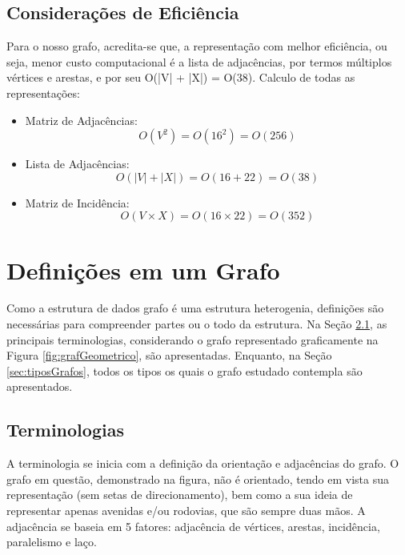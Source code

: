 	\section{Considerações de Eficiência}\label{sec:eficienciaRepresentacao}
	Para o nosso grafo, acredita-se que, a representação com melhor eficiência, ou seja, menor custo computacional é a lista de adjacências, por termos múltiplos vértices e arestas, e por seu O(|V| + |X|) = O(38). Calculo de todas as representações:
	\begin{itemize}
		\item Matriz de Adjacências:\\
		\begin{equation}
			O(V^2) = O(16^2) = O(256)
		\end{equation}
		\item Lista de Adjacências: \\
		\begin{equation}
			O(|V| + |X|) = O(16 + 22) = O(38)
		\end{equation}
		\item Matriz de Incidência:
		\begin{equation}
			O(V\times X) = O(16\times22) = O(352)
		\end{equation}
	\end{itemize}
	
	\chapter{Definições em um Grafo }\label{cap:definicoesGrafo}
	
	Como a estrutura de dados grafo é uma estrutura heterogenia, definições são necessárias para compreender partes ou o todo da estrutura. Na Seção \ref{sec:terminologias}, as principais terminologias, considerando o grafo representado graficamente na Figura  \ref{fig:grafGeometrico}, são apresentadas. Enquanto, na Seção \ref{sec:tiposGrafos}, todos os tipos os quais o grafo estudado contempla são apresentados.
	
	\section{Terminologias}\label{sec:terminologias}
	
	A terminologia se inicia com a definição da orientação e adjacências do grafo.
	O grafo em questão, demonstrado na figura, não é orientado, tendo em vista sua representação (sem setas de direcionamento), bem como a sua ideia de representar apenas avenidas e/ou rodovias, que são sempre duas mãos.
	A adjacência se baseia em 5 fatores: adjacência de vértices, arestas, incidência, paralelismo e laço.
	

